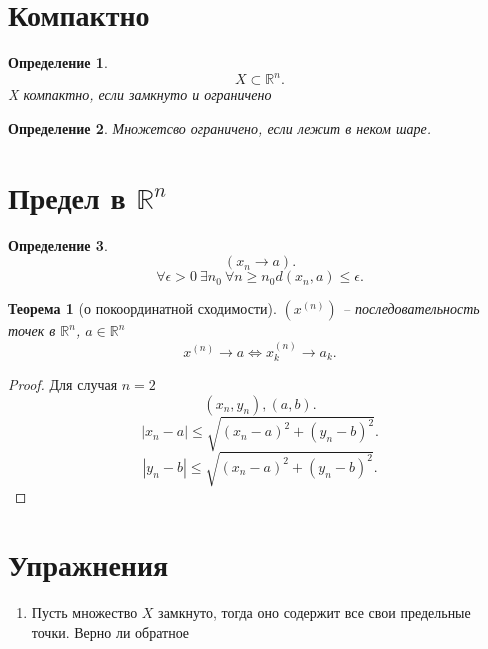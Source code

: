 \documentclass[14pt]{extarticle} \usepackage{fontspec}
\newtheorem{theorem}{Теорема}
\newtheorem{definition}{Определение}
\begin{document}
\section{Компактно}
\begin{definition}
	\[
		X \subset \mathbb{R}^{n}
		.\]
	X компактно, если замкнуто и ограничено
\end{definition}
\begin{definition}
	Множетсво ограничено, если лежит в неком шаре.
\end{definition}
\section{Предел в $\mathbb{R}^{n}$}
\begin{definition}
    \[
        (x_{n} \to a)
    .\] 
    \[
    \forall  \epsilon > 0 ~ \exists  n_{0} ~  \forall  n \ge  n_0 d(x_{n},a) \le  \epsilon
    .\] 
\end{definition}
\begin{theorem}[о покоординатной сходимости]
    $(x^{(n)})$ -- последовательность точек в $\mathbb{R}^{n}$, $a \in \mathbb{R}^{n}$
     \[
     x^{(n)} \to a \iff x_{k}^{(n)} \to a_{k}
     .\] 
\end{theorem}
\begin{proof}
    Для случая $n = 2$
     \[
         (x_{n},y_{n}) , (a,b)
    .\] 
    \[
    |x_{n} - a| \le  \sqrt{(x_{n} - a)^2 + (y_{n} - b)^2}
    .\] 
    \[
    |y_{n} - b| \le  \sqrt{(x_{n} - a)^2 + (y_{n} - b)^2}
    .\] 
\end{proof}
\section{Упражнения}
\begin{enumerate}
    \item 
Пусть множество $X$ замкнуто, тогда оно содержит все свои предельные точки. Верно ли обратное
\end{enumerate}
\end{document}
